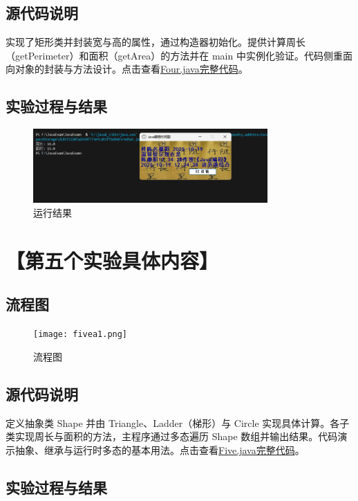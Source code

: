 \documentclass[12pt,a4paper]{article}
\begin{document}
\subsection*{源代码说明}
实现了矩形类并封装宽与高的属性，通过构造器初始化。提供计算周长（getPerimeter）和面积（getArea）的方法并在 main 中实例化验证。代码侧重面向对象的封装与方法设计。点击查看\hyperref[sec:four]{Four.java完整代码}。

\subsection*{实验过程与结果}

\begin{figure}[H]
\centering
\includegraphics[width=0.8\textwidth,height=0.8\textheight,keepaspectratio]{foura.png}
\caption{运行结果}
\end{figure}

\section*{【第五个实验具体内容】}
\subsection*{流程图}

\begin{figure}[H]
\centering
\texttt{[image: fivea1.png]}
\caption{流程图}
\end{figure}

\subsection*{源代码说明}
定义抽象类 Shape 并由 Triangle、Ladder（梯形）与 Circle 实现具体计算。各子类实现周长与面积的方法，主程序通过多态遍历 Shape 数组并输出结果。代码演示抽象、继承与运行时多态的基本用法。点击查看\hyperref[sec:five]{Five.java完整代码}。

\subsection*{实验过程与结果}
\end{document}
